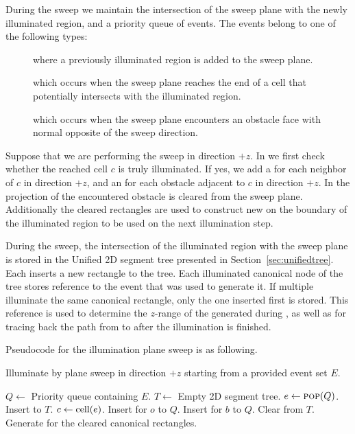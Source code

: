 \documentclass[english,gradu]{tktltiki2018}
\begin{document}
During the sweep we maintain the intersection of the sweep plane with the newly illuminated region, and a priority queue of events.
The events belong to one of the following types:

\begin{description}
\item[\addE] where a previously illuminated region is added to the sweep plane.
\item[\cellE] which occurs when the sweep plane reaches the end of a cell that potentially intersects with the illuminated region.
\item[\obsE] which occurs when the sweep plane encounters an obstacle face with normal opposite of the sweep direction.
\end{description}

Suppose that we are performing the sweep in direction $+z$.
In \cellE we first check whether the reached cell $c$ is truly illuminated.
If yes, we add a \cellE for each neighbor of $c$ in direction $+z$, and an \obsE for each obstacle adjacent to $c$ in direction $+z$.
In \obsE the projection of the encountered obstacle is cleared from the sweep plane.
Additionally the cleared rectangles are used to construct new \addEs on the boundary of the illuminated region to be used on the next illumination step.

During the sweep, the intersection of the illuminated region with the sweep plane is stored in the Unified 2D segment tree presented in Section~\ref{sec:unifiedtree}.
Each \addE inserts a new rectangle to the tree.
Each illuminated canonical node of the tree stores reference to the event that was used to generate it.
If multiple \addEs illuminate the same canonical rectangle, only the one inserted first is stored.
This reference is used to determine the $z$-range of the \addEs generated during \obsE, as well as for tracing back the path from \ept to \spt after the illumination is finished.

Pseudocode for the illumination plane sweep is as following.

\begin{alg}\label{alg:sweep3d}
Illuminate by plane sweep in direction $+z$ starting from a provided event set $E$.
\begin{algorithmic}
\State $Q\gets$ Priority queue containing $E$.
\State $T\gets$ Empty 2D segment tree.
	\State $e\gets\textsc{pop}(Q)$.
		\State Insert  to $T$.
			\State $c\gets\text{cell}(e)$.
				\State Insert \obsE for $o$ to $Q$.
			\EndFor
				\State Insert \cellE for $b$ to $Q$.
			\EndFor
		\EndIf
		\State Clear  from $T$.
		\State Generate \addEs for the cleared canonical rectangles.
	\EndIf
\EndWhile
\end{algorithmic}
\end{alg}
\end{document}
